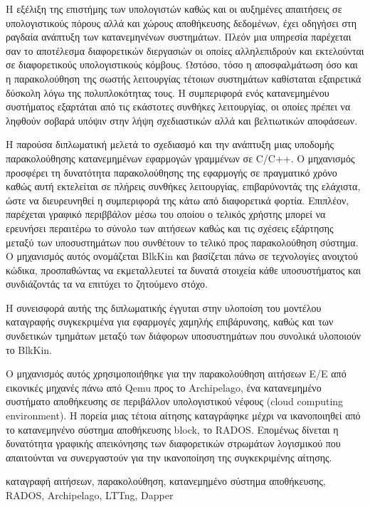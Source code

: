 \begin{abstractgr}
Η εξέλιξη της επιστήμης των υπολογιστών καθώς και οι αυξημένες απαιτήσεις σε
υπολογιστικούς πόρους αλλά και χώρους αποθήκευσης δεδομένων, έχει οδηγήσει στη
ραγδαία ανάπτυξη των κατανεμηνένων συστημάτων. Πλεόν μια υπηρεσία παρέχεται σαν
το αποτέλεσμα διαφορετικών διεργασιών οι οποίες αλληλεπιδρούν και εκτελούνται
σε διαφορετικούς υπολογιστικούς κόμβους. Ωστόσο, τόσο η αποσφαλμάτωση όσο και η
παρακολούθηση της σωστής λειτουργίας τέτοιων συστημάτων καθίσταται εξαιρετικά
δύσκολη λόγω της πολυπλοκότητας τους. H συμπεριφορά ενός κατανεμημένου
συστήματος εξαρτάται από τις εκάστοτες συνθήκες λειτουργίας, οι οποίες πρέπει
να ληφθούν σοβαρά υπόψιν στην λήψη σχεδιαστικών αλλά και βελτιωτικών αποφάσεων.

Η παρούσα διπλωματική μελετά το σχεδιασμό και την ανάπτυξη μιας υποδομής
παρακολούθησης κατανεμημένων εφαρμογών γραμμένων σε C/C++. Ο μηχανισμός
προσφέρει τη δυνατότητα παρακολούθησης της εφαρμογής σε πραγματικό χρόνο καθώς
αυτή εκτελείται σε πλήρεις συνθήκες λειτουργίας, επιβαρύνοντάς της ελάχιστα,
ώστε να διευρευνηθεί η συμπεριφορά της κάτω από διαφορετικά φορτία. Επιπλέον,
παρέχεται γραφικό περιββάλον μέσω του οποίου ο τελικός χρήστης μπορεί να
ερευνήσει περαιτέρω το σύνολο των αιτήσεων καθώς και τις σχέσεις εξάρτησης
μεταξύ των υποσυστημάτων που συνθέτουν το τελικό προς παρακολούθηση σύστημα. Ο
μηχανισμός αυτός ονομάζεται BlkKin και βασίζεται πάνω σε τεχνολογίες ανοιχτού
κώδικα, προσπαθώντας να εκμεταλλευτεί τα δυνατά στοιχεία κάθε υποσυστήματος και
συνδιάζοντάς τα να επιτύχει το ζητούμενο στόχο.

Η συνεισφορά αυτής της διπλωματικής έγγυται στην υλοποίση του μοντέλου
καταγραφής συγκεκριμένα για εφαρμογές χαμηλής επιβάρυνσης, καθώς και των
συνδετικών τμημάτων μεταξύ των διάφορων υποσυστημάτων που συνολικά υλοποιούν το
BlkKin.

Ο μηχανισμός αυτός χρησιμοποιήθηκε για την παρακολούθηση αιτήσεων Ε/Ε από
εικονικές μηχανές πάνω από Qemu προς το Archipelago, ένα κατανεμημένο συστήματο
αποθήκευσης σε περιβάλλον υπολογιστικού νέφους (cloud computing environment). Η
πορεία μιας τέτοια αίτησης καταγράφηκε μέχρι να ικανοποιηθεί από το
κατανεμηνένο σύστημα αποθήκευσης block, το RADOS. Επομένως δίνεται η δυνατότητα
γραφικής απεικόνησης των διαφορετικών στρωμάτων λογισμικού που απαιτούνται να
συνεργαστούν για την ικανοποίηση της συγκεκριμένης αίτησης.	
    \begin{keywordsgr}
    καταγραφή αιτήσεων, παρακολούθηση, κατανεμημένο σύστημα αποθήκευσης, RADOS,
    Archipelago, LTTng, Dapper
	\end{keywordsgr}
\end{abstractgr}

